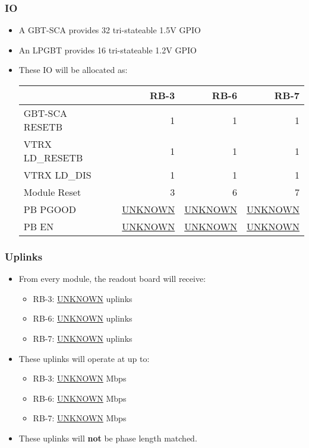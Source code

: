 \documentclass[11pt]{article}
\begin{document}
\subsubsection{IO}
\label{sec:orgceae83f}
\begin{itemize}
\item A GBT-SCA provides 32 tri-stateable 1.5V GPIO
\item An LPGBT provides 16 tri-stateable 1.2V GPIO
\item These IO will be allocated as:
\begin{center}
\begin{tabular}{llrrr}
 &  & RB-3 & RB-6 & RB-7\\
\hline
GBT-SCA RESETB &  & 1 & 1 & 1\\
VTRX LD\_RESETB &  & 1 & 1 & 1\\
VTRX LD\_DIS &  & 1 & 1 & 1\\
Module Reset &  & 3 & 6 & 7\\
PB PGOOD &  & \uline{UNKNOWN} & \uline{UNKNOWN} & \uline{UNKNOWN}\\
PB EN &  & \uline{UNKNOWN} & \uline{UNKNOWN} & \uline{UNKNOWN}\\
\end{tabular}
\end{center}
\end{itemize}

\subsubsection{Uplinks}
\label{sec:org56e9832}
\begin{itemize}
\item From every module, the readout board will receive:
\begin{itemize}
\item RB-3: \uline{UNKNOWN} uplinks
\item RB-6: \uline{UNKNOWN} uplinks
\item RB-7: \uline{UNKNOWN} uplinks
\end{itemize}
\item These uplinks will operate at up to:
\begin{itemize}
\item RB-3: \uline{UNKNOWN} Mbps
\item RB-6: \uline{UNKNOWN} Mbps
\item RB-7: \uline{UNKNOWN} Mbps
\end{itemize}
\item These uplinks will \textbf{not} be phase length matched.
\end{itemize}
\end{document}
